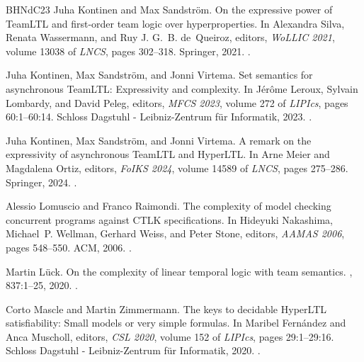 \documentclass[dvipsnames,10pt,a4paper]{amsart}
\theoremstyle{definition}
\theoremstyle{remark}
\begin{document}
\begin{thebibliography}{BHNdC23}
Juha Kontinen and Max Sandstr{\"{o}}m.
\newblock On the expressive power of {TeamLTL} and first-order team logic over
  hyperproperties.
\newblock In Alexandra Silva, Renata Wassermann, and Ruy J. G.~B. de~Queiroz,
  editors, {\em WoLLIC 2021}, volume 13038 of {\em LNCS}, pages 302--318.
  Springer, 2021.
\newblock \href {https://doi.org/10.1007/978-3-030-88853-4\_19}
  {}.

Juha Kontinen, Max Sandstr{\"{o}}m, and Jonni Virtema.
\newblock Set semantics for asynchronous {TeamLTL}: Expressivity and
  complexity.
\newblock In J{\'{e}}r{\^{o}}me Leroux, Sylvain Lombardy, and David Peleg,
  editors, {\em {MFCS} 2023}, volume 272 of {\em LIPIcs}, pages 60:1--60:14.
  Schloss Dagstuhl - Leibniz-Zentrum für Informatik, 2023.
\newblock \href {https://doi.org/10.4230/LIPICS.MFCS.2023.60}
  {}.

Juha Kontinen, Max Sandstr{\"{o}}m, and Jonni Virtema.
\newblock A remark on the expressivity of asynchronous {TeamLTL} and
  {HyperLTL}.
\newblock In Arne Meier and Magdalena Ortiz, editors, {\em FoIKS 2024}, volume
  14589 of {\em LNCS}, pages 275--286. Springer, 2024.
\newblock \href {https://doi.org/10.1007/978-3-031-56940-1\_15}
  {}.

Alessio Lomuscio and Franco Raimondi.
\newblock The complexity of model checking concurrent programs against {CTLK}
  specifications.
\newblock In Hideyuki Nakashima, Michael~P. Wellman, Gerhard Weiss, and Peter
  Stone, editors, {\em {AAMAS} 2006}, pages 548--550. {ACM}, 2006.
\newblock \href {https://doi.org/10.1145/1160633.1160733}
  {}.

Martin L{\"{u}}ck.
\newblock On the complexity of linear temporal logic with team semantics.
, 837:1--25, 2020.
\newblock \href {https://doi.org/10.1016/j.tcs.2020.04.019}
  {}.

Corto Mascle and Martin Zimmermann.
\newblock The keys to decidable {HyperLTL} satisfiability: Small models or very
  simple formulas.
\newblock In Maribel Fern{\'{a}}ndez and Anca Muscholl, editors, {\em {CSL}
  2020}, volume 152 of {\em LIPIcs}, pages 29:1--29:16. Schloss Dagstuhl -
  Leibniz-Zentrum für Informatik, 2020.
\newblock \href {https://doi.org/10.4230/LIPIcs.CSL.2020.29}
  {}.


\end{thebibliography}
\end{document}
